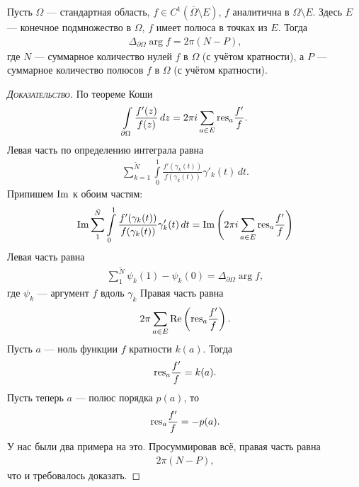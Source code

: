 \documentclass[../../main.tex]{subfiles}
\begin{document}
\begin{thm}
 Пусть $ \Omega $ --- стандартная область, $ f \in C^{1}(\overline \Omega \setminus E) $, $ f $ аналитична в $ \Omega \setminus E $. Здесь $ E $ --- конечное подмножество в $ \Omega $, $ f $ имеет полюса в точках из $ E $. Тогда
 \begin{align*}
  \Delta_{\partial \Omega} \arg f = 2\pi(N - P),
 \end{align*} где $ N $ --- суммарное количество нулей $ f $ в $ \Omega $ (с учётом кратности), а $ P $ --- суммарное количество  полюсов $ f $ в $ \Omega $ (с учётом кратности).
\end{thm}
\begin{proof}[\normalfont\textsc{Доказательство}]
 По теореме Коши
 \begin{align*}
  \int\limits_{\partial\Omega} \frac{f'(z)}{f(z)} \,dz = 2\pi i \sum_{a \in E} \mathrm{res}_a \frac{f'}{f}.
 \end{align*} Левая часть по определению интеграла равна
 \begin{align*}
  \sum_{k=1}^{\tilde N} \int\limits_{0}^{1} \frac{f'(\gamma_k(t))}{f(\gamma_k(t))}\gamma'_k(t)\,dt.
 \end{align*} Припишем $ \operatorname{Im}$ к обоим частям:
 \begin{align*}
  \operatorname{Im} \sum_{1}^{\tilde N} \int\limits_{0}^{1} \frac{f'(\gamma_k(t))}{f(\gamma_k(t))}\gamma'_k(t)\,dt = \operatorname{Im} \left( 2\pi i \sum_{a \in E}\mathrm{res}_a \frac{f'}{f} \right)
 \end{align*} Левая часть равна
 \begin{align*}
  \sum_{1}^{\tilde N} \psi_k(1) - \psi_k(0) = \Delta_{\partial \Omega} \arg f,
 \end{align*} где $ \psi_k $ --- аргумент $ f $ вдоль $ \gamma_k $ Правая часть равна
 \begin{align*}
  2\pi \sum_{a \in E} \operatorname{Re} \left( \mathrm{res}_a \frac{f'}{f} \right).
 \end{align*} Пусть $ a $ --- ноль функции $ f $ кратности $ k(a) $. Тогда
 \begin{align*}
  \mathrm{res}_a \frac{f'}{f} = k(a).
 \end{align*} Пусть теперь $ a $ --- полюс порядка $ p(a) $, то
 \begin{align*}
  \mathrm{res}_a \frac{f'}{f} = -p(a).
 \end{align*} У нас были два примера на это. Просуммировав всё, правая часть равна
 \begin{align*}
  2\pi (N-P),
 \end{align*} что и требовалось доказать.
\end{proof}
\end{document}
